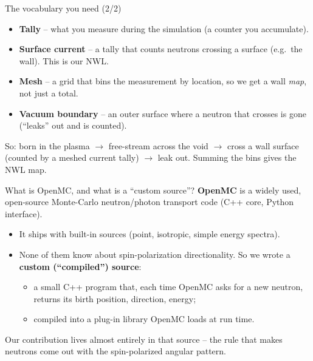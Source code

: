 \documentclass[aspectratio=169]{beamer}
\newcommand{\keyword}[1]{\textcolor{blue!60!black}{\textbf{#1}}}
\begin{document}
\begin{frame}{The vocabulary you need (2/2)}
  \begin{itemize}
    \item \keyword{Tally} -- what you \alert{measure} during the simulation (a counter you accumulate).
    \item \keyword{Surface current} -- a tally that counts neutrons \alert{crossing a surface} (e.g.\ the wall). This is our NWL.
    \item \keyword{Mesh} -- a grid that \alert{bins} the measurement by location, so we get a wall \emph{map}, not just a total.
    \item \keyword{Vacuum boundary} -- an outer surface where a neutron that crosses is \alert{gone} (``leaks'' out and is counted).
  \end{itemize}
  \vfill
  \footnotesize So: born in the plasma $\to$ free-stream across the void $\to$ cross a wall surface (counted by a meshed current tally) $\to$ leak out. Summing the bins gives the NWL map.
\end{frame}

\begin{frame}{What is OpenMC, and what is a ``custom source''?}
  \keyword{OpenMC} is a widely used, open-source Monte-Carlo neutron/photon transport code (C++ core, Python interface).
  \vfill
  \begin{itemize}
    \item It ships with \alert{built-in sources} (point, isotropic, simple energy spectra).
    \item None of them know about \alert{spin-polarization directionality}. So we wrote a \keyword{custom (``compiled'') source}:
      \begin{itemize}\footnotesize
        \item a small C++ program that, each time OpenMC asks for a new neutron, returns its birth \alert{position, direction, energy};
        \item compiled into a plug-in library OpenMC loads at run time.
      \end{itemize}
  \end{itemize}
  \vfill
  \alert{Our contribution lives almost entirely in that source} -- the rule that makes neutrons come out with the spin-polarized angular pattern.
\end{frame}

\end{document}

